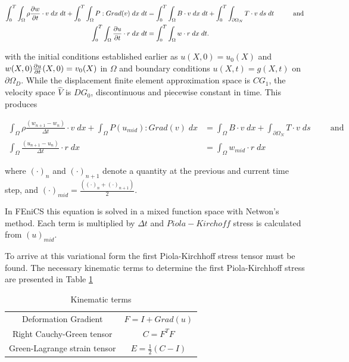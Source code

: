 \documentclass{article}
\begin{document}
\begin{align}
\int_{0}^{T} \int_{\Omega} \rho \frac{\partial w}{\partial t} \cdot v \; dx  \; dt + \int_{0}^{T} \int_{\Omega} P: Grad(v) \; dx \; dt &= \int_{0}^{T} \int_{\Omega} B \cdot v \; dx \; dt + \int_{0}^{T} \int_{\partial \Omega_N} T \cdot v \; ds \; dt \hspace{1cm} \text{and} \\
\int_{0}^{T} \int_{\Omega} \frac{\partial u}{\partial t} \cdot r \; dx \; dt &= \int_{0}^{T} \int_{\Omega} w \cdot r \; dx \; dt. 
\end{align}

with the initial conditions established earlier as $u(X,0) = u_0(X)$ and $w(X,0) \frac{\partial u}{\partial t} (X,0) = v_0(X)$ in $\Omega$ and boundary conditions $u(X,t) = g(X,t)$ on $\partial \Omega_D$. While the displacement finite element approximation space is $CG_1$, the velocity space $\hat{V}$ is $DG_0$, discontinuous and piecewise constant in time. This produces

\begin{align}
\int_{\Omega} \rho \frac{(w_{n+1} - w_n)}{\Delta t} \cdot v \; dx  + \int_{\Omega} P (u_{mid}): Grad(v) \; dx  &=  \int_{\Omega} B \cdot v \; dx + \int_{\partial \Omega_N} T \cdot v \; ds  \hspace{1cm} \text{and} \\
\int_{\Omega} \frac{(u_{n+1} - u_n)}{\Delta t} \cdot r \; dx  &= \int_{\Omega} w_{mid} \cdot r \; dx 
\end{align}

where $(\cdot)_n$ and $(\cdot)_{n+1}$ denote a quantity at the previous and current time step, and $(\cdot)_{mid} = \frac{((\cdot)_n +(\cdot)_{n+1})}{2}$. 

In FEniCS this equation is solved in a mixed function space with Netwon's method. Each term is multiplied by $\Delta t$ and $Piola-Kirchoff$ stress is calculated from $(u)_{mid}$.

 To arrive at this variational form the first Piola-Kirchhoff stress tensor must be found. The necessary kinematic terms to determine the first Piola-Kirchhoff stress are presented in Table \ref{tab:kinematics}

\FloatBarrier
  \begin{table}[htbp]
  \setlength\extrarowheight{5pt}
  \centering
  \caption{Kinematic terms}
    \begin{tabular}{cc}
    Deformation Gradient & $F = I + Grad(u)$\\
    Right Cauchy-Green tensor & $C = F^T F$ \\
    Green-Lagrange strain tensor & $E = \frac{1}{2}(C - I)$ \\
    \end{tabular}%
  \label{tab:kinematics}%
\end{table}%
\FloatBarrier
\end{document}
